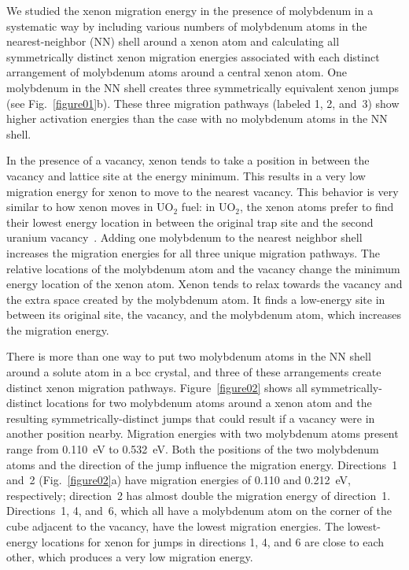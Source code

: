 We studied the xenon migration energy in the presence of molybdenum in a
systematic way by including various numbers of molybdenum atoms in the
nearest-neighbor (NN) shell around a xenon atom and calculating all
symmetrically distinct xenon migration energies associated with each distinct
arrangement of molybdenum atoms around a central xenon atom.
One molybdenum in the NN shell creates three symmetrically equivalent xenon
jumps (see Fig.~\ref{figure01}b). These three migration pathways (labeled 1, 2,
and~3) show higher activation energies than the case with no molybdenum atoms
in the NN shell.

In the presence of a vacancy, xenon tends to take a position in between the
vacancy and lattice site at the energy minimum. This results in a very low
migration energy for xenon to move to the nearest vacancy. 
This behavior is very similar to how xenon moves in UO$_2$ fuel: in UO$_2$, the
xenon atoms prefer to find their lowest energy location in between the original
trap site and the second uranium vacancy~\cite{andersson2011u}. Adding one
molybdenum to the nearest neighbor shell increases the migration energies for
all three unique migration pathways.
The relative locations of the molybdenum atom and the vacancy change the
minimum energy location of the xenon atom. Xenon tends to relax towards the
vacancy and the extra space created by the molybdenum atom. It finds a
low-energy site in between its original site, the vacancy, and the molybdenum
atom, which increases the migration energy.

There is more than one way to put two molybdenum atoms in the
NN shell around a solute atom in a bcc crystal, and three of these arrangements
create distinct xenon migration pathways. Figure~\ref{figure02} shows all
symmetrically-distinct locations for two molybdenum atoms around a xenon atom
and the resulting symmetrically-distinct jumps that could result if a vacancy
were in another position nearby. Migration energies with two molybdenum atoms
present range from 0.110~eV to 0.532~eV\@. 
Both the positions of the two molybdenum atoms and the direction of the jump
influence the migration energy.
Directions~1 and~2 (Fig.~\ref{figure02}a) have migration energies of 0.110
and 0.212~eV, respectively; direction~2 has almost double the migration energy
of direction~1.
Directions~1, 4, and~6, which all have a molybdenum atom on the corner of the
cube adjacent to the vacancy, have the lowest migration energies.
The lowest-energy locations for xenon for jumps in directions 1, 4, and 6 are
close to each other, which produces a very low migration energy.


